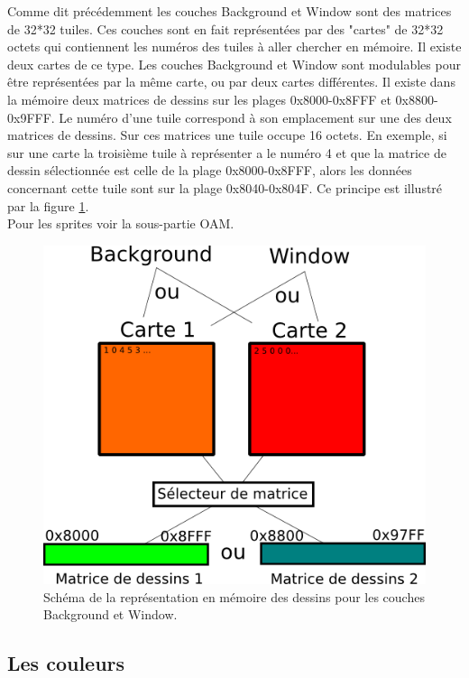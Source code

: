 \documentclass[french]{report}
\begin{document}
Comme dit précédemment les couches Background et Window sont des matrices de 32*32 tuiles. Ces couches sont en fait représentées par des "cartes" de 32*32 octets qui contiennent les numéros des tuiles à aller chercher en mémoire. Il existe deux cartes de ce type. Les couches Background et Window sont modulables pour être représentées par la même carte, ou par deux cartes différentes. Il existe dans la mémoire deux matrices de dessins sur les plages 0x8000-0x8FFF et 0x8800-0x9FFF. Le numéro d'une tuile correspond à son emplacement sur une des deux matrices de dessins. Sur ces matrices une tuile occupe 16 octets. En exemple, si sur une carte la troisième tuile à représenter a le numéro 4 et que la matrice de dessin sélectionnée est celle de la plage 0x8000-0x8FFF, alors les données concernant cette tuile sont sur la plage 0x8040-0x804F. Ce principe est illustré par la figure \ref{gpu_dessins}.\\Pour les sprites voir la sous-partie OAM.

\begin{figure}[!h]
\centering
\includegraphics[scale=0.8]{images/schema_matrice_dessin.png}
\caption{Schéma de la représentation en mémoire des dessins pour les couches Background et Window.}
\label{gpu_dessins}
\end{figure}

\subsection{Les couleurs}
\end{document}

